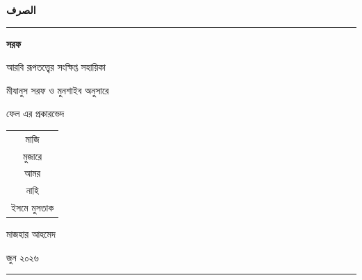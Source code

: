 \begin{titlepage}
  \thispagestyle{empty}
  \centering

  \vspace*{1.2cm}

  {\arabicfont \color{titlegreen}\Huge\textbf{\textarabic{الصرف}}\par}

  \vspace{0.7cm}

  {\color{titlegreen}\rule{0.72\textwidth}{1pt}\par}

  \vspace{0.9cm}

  {\Huge\bfseries সরফ\par}

  \vspace{0.35cm}

  {\Large আরবি রূপতত্ত্বের সংক্ষিপ্ত সহায়িকা\par}

  \vspace{0.25cm}

  {\large মীযানুস সরফ ও মুনশাইব অনুসারে\par}

  \vspace{1.5cm}

  {\large ফেল এর প্রকারভেদ\par}

  \vspace{0.45cm}

  \begin{minipage}{0.72\textwidth}
    \centering
    \begin{tabular}{c}
      মাজি \\
      মুজারে \\
      আমর \\
      নাহি \\
      ইসমে মুসতাক
    \end{tabular}
  \end{minipage}

  \vfill

  {\large মাজহার আহমেদ\par}

  \vspace{0.25cm}

  {\large জুন ২০২৬\par}

  \vspace{0.8cm}

  {\color{titlegreen}\rule{0.72\textwidth}{1pt}\par}
\end{titlepage}
